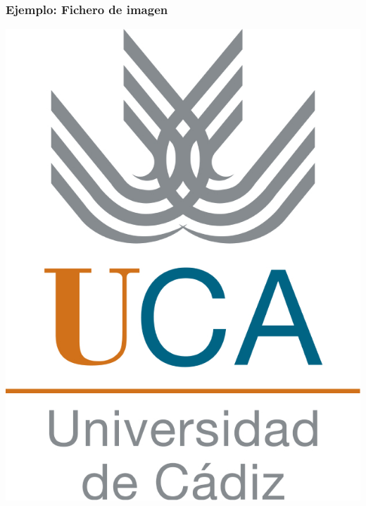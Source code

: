 \documentclass{beamer}
\begin{document}
\begin{frame}
    \frametitle{Ejemplo: Fichero de imagen}
    \centering
    \includegraphics[scale=0.8]{uca_HR} 

\end{frame}
\end{document}
